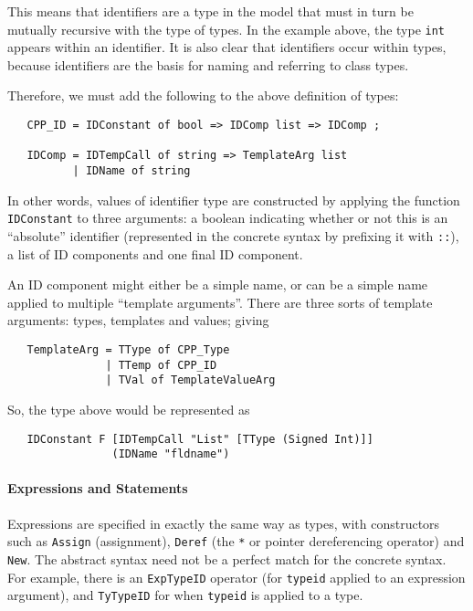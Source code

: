 \documentclass[11pt]{article}
\begin{document}
This means that identifiers are a type in the model that must in turn
be mutually recursive with the type of types.  In the example above,
the type \texttt{int} appears within an identifier.  It is also clear
that identifiers occur within types, because identifiers are the basis
for naming and referring to class types.

Therefore, we must add the following to the above definition of \cpp{}
types:
\begin{verbatim}
   CPP_ID = IDConstant of bool => IDComp list => IDComp ;

   IDComp = IDTempCall of string => TemplateArg list
          | IDName of string
\end{verbatim}
In other words, values of identifier type are constructed by applying
the function \texttt{IDConstant} to three arguments: a boolean
indicating whether or not this is an ``absolute'' identifier
(represented in the concrete syntax by prefixing it with \texttt{::}),
a list of ID components and one final ID component.

An ID component might either be a simple name, or can be a simple name
applied to multiple ``template arguments''.  There are three sorts of
template arguments: types, templates and values; giving
\begin{verbatim}
   TemplateArg = TType of CPP_Type
               | TTemp of CPP_ID
               | TVal of TemplateValueArg
\end{verbatim}
So, the type above would be represented as
\begin{verbatim}
   IDConstant F [IDTempCall "List" [TType (Signed Int)]]
                (IDName "fldname")
\end{verbatim}


\paragraph{Expressions and Statements}

Expressions are specified in exactly the same way as types, with
constructors such as \texttt{Assign} (assignment), \texttt{Deref} (the
\texttt{*} or pointer dereferencing operator) and \texttt{New}.  The
abstract syntax need not be a perfect match for the concrete syntax.
For example, there is an \texttt{ExpTypeID} operator (for
\texttt{typeid} applied to an expression argument), and
\texttt{TyTypeID} for when \texttt{typeid} is applied to a type.
\end{document}
